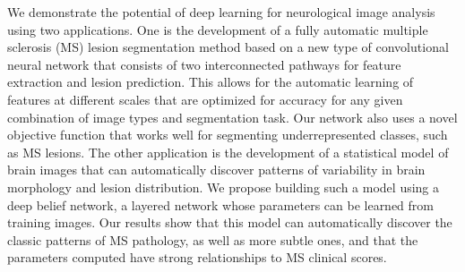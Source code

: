 We demonstrate the potential of deep learning for neurological image analysis
using two applications. One is the development of a fully automatic multiple
sclerosis (MS) lesion segmentation method based on a new type of convolutional
neural network that consists of two interconnected pathways for feature
extraction and lesion prediction. This allows for the automatic learning of
features at different scales that are optimized for accuracy for any given
combination of image types and segmentation task. Our network also uses a novel
objective function that works well for segmenting underrepresented classes, such
as MS lesions. The other application is the development of a statistical model
of brain images that can automatically discover patterns of variability in brain
morphology and lesion distribution. We propose building such a model using a
deep belief network, a layered network whose parameters can be learned from
training images. Our results show that this model can automatically discover the
classic patterns of MS pathology, as well as more subtle ones, and that the
parameters computed have strong relationships to MS clinical scores.


